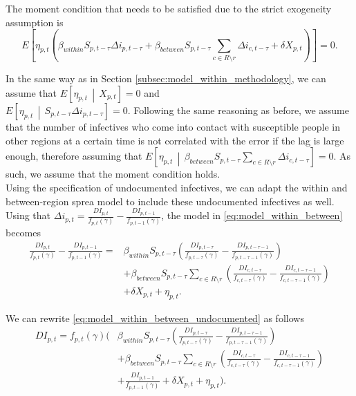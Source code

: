 \documentclass[12pt]{article}
\begin{document}
	The moment condition that needs to be satisfied due to the strict exogeneity assumption is
	    \[E\left[ \eta_{p,t} \left( \beta_{within} S_{p,t-\tau} \Delta i_{p,t-\tau}  + \beta_{between}S_{p,t-\tau} \sum_{c \in R \setminus r} \Delta i_{c, t-\tau} + \delta X_{p,t} \right) \right] = 0.\]
	    
	In the same way as in Section \ref{subsec:model_within_methodology}, we can assume that $E\left[\eta_{p,t} \,\middle|\, X_{p,t}\right] = 0$ and \\
	$E\left[\eta_{p,t} \,\middle|\, S_{p,t-\tau} \Delta i_{p,t-\tau}\right] = 0$. Following the same reasoning as before, we assume that the number of infectives who come into contact with susceptible people in other regions at a certain time is not correlated with the error if the lag is large enough, therefore assuming that $E\left[\eta_{p,t} \,\middle|\, \beta_{between}S_{p,t-\tau} \sum_{c \in R \setminus r} \Delta i_{c, t-\tau}\right] = 0$. As such, we assume that the moment condition holds. \\
	
	Using the specification of undocumented infectives, we can adapt the within and between-region sprea model to include these undocumented infectives as well. Using that $\Delta i_{p,t} = \frac{DI_{p,t}}{f_{p,t}(\gamma)} - \frac{DI_{p,t-1}}{f_{p,t-1}(\gamma)}$, the model in \eqref{eq:model_within_between} becomes
	    \begin{equation} \label{eq:model_within_between_undocumented}
            \begin{split}
        		\frac{DI_{p,t}}{f_{p,t}(\gamma)} - \frac{DI_{p,t-1}}{f_{p,t-1}(\gamma)} = &\beta_{within}S_{p,t-\tau}\left(\frac{DI_{p,t-\tau}}{f_{p,t-\tau}(\gamma)} - \frac{DI_{p,t-\tau-1}}{f_{p,t-\tau-1}(\gamma)}\right) \\
    		    &+ \beta_{between}S_{p,t-\tau} \sum_{c \in R \setminus r} \left(\frac{DI_{c,t-\tau}}{f_{c,t-\tau}(\gamma)} - \frac{DI_{c,t-\tau-1}}{f_{c,t-\tau-1}(\gamma)} \right) \\
    		    &+ \delta X_{p,t} + \eta_{p,t}.
    		\end{split}
        \end{equation}
	
	We can rewrite \eqref{eq:model_within_between_undocumented} as follows
	    \begin{align*}
	       DI_{p,t} = f_{p,t}(\gamma)\Bigg(&\beta_{within}S_{p,t-\tau}\left(\frac{DI_{p,t-\tau}}{f_{p,t-\tau}(\gamma)} - \frac{DI_{p,t-\tau-1}}{f_{p,t-\tau-1}(\gamma)}\right) \\
	       &+ \beta_{between}S_{p,t-\tau} \sum_{c \in R \setminus r} \left(\frac{DI_{c,t-\tau}}{f_{c,t-\tau}(\gamma)} - \frac{DI_{c,t-\tau-1}}{f_{c,t-\tau-1}(\gamma)} \right) \\
	       & + \frac{DI_{p,t-1}}{f_{p,t-1}(\gamma)} + \delta X_{p,t} + \eta_{p,t}\Bigg).
	    \end{align*}
	    
\end{document}
